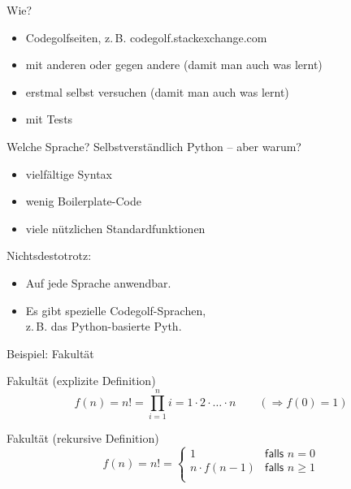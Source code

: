 \documentclass[xcolor=dvipsnames, aspectratio=169, 14pt]{beamer}
\begin{document}
\begin{frame}{Wie?}
	\begin{itemize}
		\setlength{\itemsep}{\fill}
		\item Codegolfseiten, z.\,B. codegolf.stackexchange.com
		\item mit anderen oder gegen andere (damit man auch was lernt)
		\item erstmal selbst versuchen (damit man auch was lernt)
		\item mit Tests
	\end{itemize}
\end{frame}

\begin{frame}{Welche Sprache?}
	Selbstverständlich Python – aber warum?
	\begin{itemize}
		\item vielfältige Syntax
		\item wenig Boilerplate-Code
		\item viele nützlichen Standardfunktionen
	\end{itemize}
	
	\vfill
	
	Nichtsdestotrotz:
	\begin{itemize}
		\item Auf jede Sprache anwendbar.
		\item Es gibt spezielle Codegolf-Sprachen,\\
			z. B. das Python-basierte Pyth.
	\end{itemize}
\end{frame}


\begin{frame}{Beispiel: Fakultät}
	\begin{block}{Fakultät (explizite Definition)}
	\[f(n) = n! = \prod_{i=1}^n i = 1·2·…·n \qquad (⇒f(0)=1)\]
	\end{block}
	
	\pause
	
	\begin{block}{Fakultät (rekursive Definition)}
	\[f(n) = n! = \begin{cases}
			1 & \textsf{falls~} n=0\\
			n·f(n-1) & \textsf{falls~} n \geq 1\\
	         \end{cases}\]
	\end{block}
\end{frame}
\end{document}

